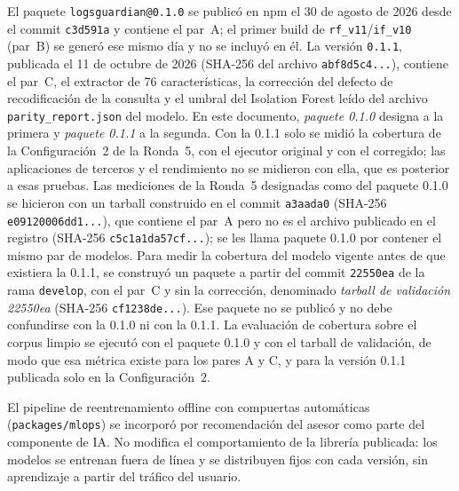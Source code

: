 El paquete \texttt{logsguardian@0.1.0} se publicó en npm el 30 de agosto de 2026 desde el commit
\texttt{c3d591a} y contiene el par~A; el primer build de \texttt{rf\_v11}/\texttt{if\_v10} (par~B) se
generó ese mismo día y no se incluyó en él. La versión \texttt{0.1.1}, publicada el 11 de octubre de
2026 (SHA-256 del archivo \texttt{abf8d5c4...}), contiene el par~C, el extractor de 76
características, la corrección del defecto de recodificación de la consulta y el umbral del Isolation Forest leído del archivo \texttt{parity\_report.json} del modelo. En este
documento, \textit{paquete 0.1.0}
designa a la primera y \textit{paquete 0.1.1} a la segunda. Con la 0.1.1 solo se midió la cobertura de la Configuración~2 de la Ronda~5, con el ejecutor
original y con el corregido; las aplicaciones de terceros y el rendimiento no se midieron con ella,
que es posterior a esas pruebas. Las mediciones de la Ronda~5 designadas como del paquete 0.1.0
se hicieron con un tarball construido en el commit \texttt{a3aada0} (SHA-256 \texttt{e09120006dd1...}),
que contiene el par~A pero no es el archivo publicado en el registro (SHA-256
\texttt{c5c1a1da57cf...}); se les llama paquete 0.1.0 por contener el mismo par de modelos.
Para medir la cobertura del modelo vigente antes de que existiera la 0.1.1, se construyó un
paquete a partir del commit \texttt{22550ea} de la rama \texttt{develop}, con el par~C y sin la
corrección, denominado \textit{tarball de validación 22550ea} (SHA-256 \texttt{cf1238de...}). Ese
paquete no se publicó y no debe confundirse con la 0.1.0 ni con la 0.1.1. La evaluación de
cobertura sobre el corpus limpio se ejecutó con el paquete 0.1.0 y con el tarball de validación,
de modo que esa métrica existe para los pares A y C, y para la versión 0.1.1 publicada solo en la Configuración~2.

El pipeline de reentrenamiento offline con compuertas automáticas (\texttt{packages/mlops}) se
incorporó por recomendación del asesor como parte del componente de IA. No modifica el
comportamiento de la librería publicada: los modelos se entrenan fuera de línea y se distribuyen
fijos con cada versión, sin aprendizaje a partir del tráfico del usuario.

